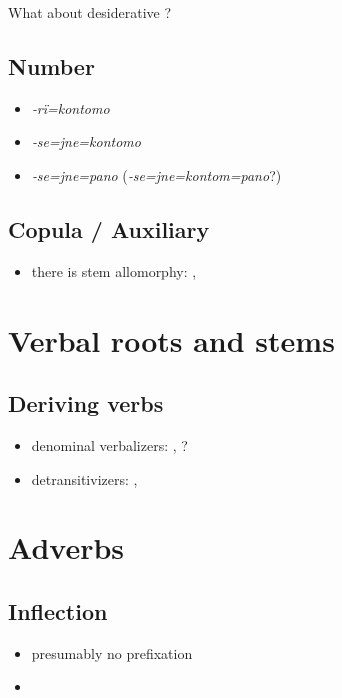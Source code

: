 \documentclass{memoir}
\begin{document}
What about desiderative ?

\section{Number}

\begin{itemize}
\tightlist
\item
  \emph{‑rï=kontomo}
\item
  \emph{‑se=jne=kontomo}
\item
  \emph{‑se=jne=pano} (\emph{‑se=jne=kontom=pano}?)
\end{itemize}

\section{Copula / Auxiliary}

\begin{itemize}
\tightlist
\item
  there is stem allomorphy: , 
\end{itemize}

\chapter{\texorpdfstring{Verbal roots and stems
\label{derbderiv}}{Verbal roots and stems }}

\section{Deriving verbs}

\begin{itemize}
\tightlist
\item
  denominal verbalizers: , ?
\item
  detransitivizers: , 
\end{itemize}

\chapter{\texorpdfstring{Adverbs \label{adverbs}}{Adverbs }}

\section{Inflection}

\begin{itemize}
\tightlist
\item
  presumably no prefixation
\item
\end{itemize}
\end{document}
